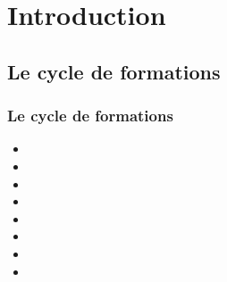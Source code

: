 \section{Introduction} \begin{frame}\tableofcontents[currentsection,currentsubsection,subsectionstyle=show/show/hide]\end{frame}



\subsection{Le cycle de formations}

\begin{frame}
\frametitle{Le cycle de formations}

\begin{itemize}

\item \formationA
\item \yo{\formationB}
\item \formationC
\item \formationD
\item \formationE
\item \formationF
\item \formationG
\item \formationH

\end{itemize}

\end{frame}
